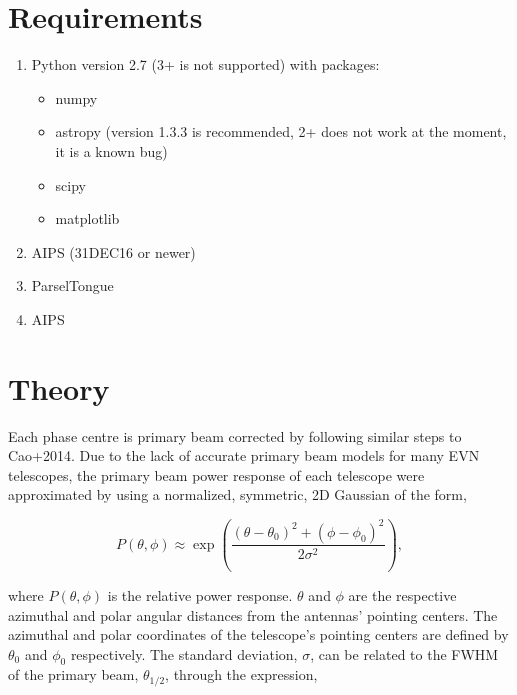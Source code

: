 \documentclass[idxtotoc,hyperref,openany]{article} %
\begin{document}

\section{Requirements}

\begin{enumerate}[topsep=0pt,itemsep=-1ex,partopsep=1ex,parsep=1ex]
	\item Python version 2.7 (3+ is not supported) with packages:
	\begin{itemize}[topsep=0pt,itemsep=-1ex,partopsep=1ex,parsep=1ex]
		\item numpy
		\item astropy (version 1.3.3 is recommended, 2+ does not work at the moment, it is a known bug)
		\item scipy
		\item matplotlib
	\end{itemize}
	\item AIPS (31DEC16 or newer)
	\item ParselTongue 
	\item AIPS
\end{enumerate}


\section{Theory}

Each phase centre is primary beam corrected by following similar steps to Cao+2014. Due to the lack of accurate primary beam models for many EVN telescopes, the primary beam power response of each telescope were approximated by using a normalized, symmetric, 2D Gaussian of the form,

\begin{equation}
P(\theta, \phi) \approx \exp\left({\frac{(\theta- \theta_0)^2 + (\phi - \phi_0)^{2}}{2\sigma^2}}\right),
\end{equation}

\noindent where $P(\theta,\phi)$ is the relative power response. $\theta$ and $\phi$ are the respective azimuthal and polar angular distances from the antennas' pointing centers. The azimuthal and polar coordinates of the telescope's pointing centers are defined by $\theta_0$ and $\phi_0$ respectively. The standard deviation, $\sigma$, can be related to the FWHM of the primary beam, $\theta_{1/2}$, through the expression,
\end{document}
